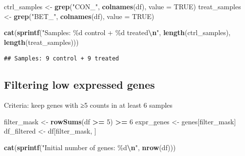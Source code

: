 \documentclass[
]{article}
\newenvironment{Shaded}{\begin{snugshade}}{\end{snugshade}}
\newcommand{\AttributeTok}[1]{\textcolor[rgb]{0.13,0.29,0.53}{#1}}
\newcommand{\CommentTok}[1]{\textcolor[rgb]{0.56,0.35,0.01}{\textit{#1}}}
\newcommand{\ConstantTok}[1]{\textcolor[rgb]{0.56,0.35,0.01}{#1}}
\newcommand{\DecValTok}[1]{\textcolor[rgb]{0.00,0.00,0.81}{#1}}
\newcommand{\FunctionTok}[1]{\textcolor[rgb]{0.13,0.29,0.53}{\textbf{#1}}}
\newcommand{\NormalTok}[1]{#1}
\newcommand{\OtherTok}[1]{\textcolor[rgb]{0.56,0.35,0.01}{#1}}
\newcommand{\SpecialCharTok}[1]{\textcolor[rgb]{0.81,0.36,0.00}{\textbf{#1}}}
\newcommand{\StringTok}[1]{\textcolor[rgb]{0.31,0.60,0.02}{#1}}
\begin{document}
\begin{Shaded}
\begin{Highlighting}[]
\NormalTok{ctrl\_samples }\OtherTok{\textless{}{-}} \FunctionTok{grep}\NormalTok{(}\StringTok{"CON\_"}\NormalTok{, }\FunctionTok{colnames}\NormalTok{(df), }\AttributeTok{value =} \ConstantTok{TRUE}\NormalTok{)}
\NormalTok{treat\_samples }\OtherTok{\textless{}{-}} \FunctionTok{grep}\NormalTok{(}\StringTok{"BET\_"}\NormalTok{, }\FunctionTok{colnames}\NormalTok{(df), }\AttributeTok{value =} \ConstantTok{TRUE}\NormalTok{)}

\FunctionTok{cat}\NormalTok{(}\FunctionTok{sprintf}\NormalTok{(}\StringTok{"Samples: \%d control + \%d treated}\SpecialCharTok{\textbackslash{}n}\StringTok{"}\NormalTok{, }
            \FunctionTok{length}\NormalTok{(ctrl\_samples), }\FunctionTok{length}\NormalTok{(treat\_samples)))}
\end{Highlighting}
\end{Shaded}

\begin{verbatim}
## Samples: 9 control + 9 treated
\end{verbatim}

\begin{Shaded}
\end{Shaded}

\subsection{Filtering low expressed
genes}\label{filtering-low-expressed-genes}

Criteria: keep genes with ≥5 counts in at least 6 samples

\begin{Shaded}
\begin{Highlighting}[]
\NormalTok{filter\_mask }\OtherTok{\textless{}{-}} \FunctionTok{rowSums}\NormalTok{(df }\SpecialCharTok{\textgreater{}=} \DecValTok{5}\NormalTok{) }\SpecialCharTok{\textgreater{}=} \DecValTok{6}
\NormalTok{expr\_genes }\OtherTok{\textless{}{-}}\NormalTok{ genes[filter\_mask]}
\NormalTok{df\_filtered }\OtherTok{\textless{}{-}}\NormalTok{ df[filter\_mask, ]}

\FunctionTok{cat}\NormalTok{(}\FunctionTok{sprintf}\NormalTok{(}\StringTok{"Initial number of genes: \%d}\SpecialCharTok{\textbackslash{}n}\StringTok{"}\NormalTok{, }\FunctionTok{nrow}\NormalTok{(df)))}
\end{Highlighting}
\end{Shaded}
\end{document}
